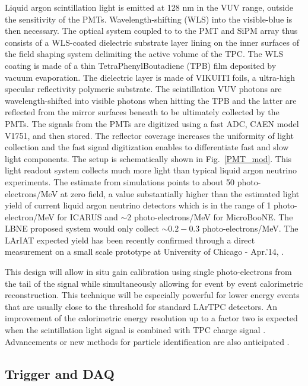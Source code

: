 \documentclass[DIV=calc, paper=a4, fontsize=10pt, twocolumn]{scrartcl}	 %
\begin{document}
{Liquid argon scintillation light is emitted at 128 nm in the VUV range, outside the sensitivity of the PMTs. Wavelength-shifting (WLS) into the visible-blue is then necessary. The optical system coupled to to the PMT and SiPM array thus consists of a WLS-coated dielectric substrate layer lining on the inner surfaces of the field shaping system delimiting the active volume of the TPC. The WLS coating is made of a thin TetraPhenylBoutadiene (TPB) film deposited by vacuum evaporation. The dielectric layer is made of VIKUITI foils, a ultra-high specular reflectivity polymeric substrate. The scintillation VUV photons are wavelength-shifted into visible photons when hitting the TPB and the latter are reflected from the mirror surfaces beneath to be ultimately collected by the PMTs. The signals from the PMTs are digitized using a fast ADC, CAEN model V1751, and then stored.  The reflector coverage increases the uniformity of light collection and the fast  signal digitization enables to differentiate fast and slow light components. The setup is schematically shown in Fig.~\ref{PMT_mod}. This light readout system collects much more light than typical liquid argon neutrino experiments. The estimate from simulations points to about 50 photo-electrons/MeV at zero field, a value substantially higher than the estimated light yield of current liquid argon neutrino detectors  which is in the range of 1 photo-electron/MeV for ICARUS and  $\sim$2 photo-electrons/MeV for MicroBooNE.  The LBNE proposed system would only collect $\sim 0.2-0.3$ photo-electrons/MeV. The LArIAT expected yield has been recently confirmed through a direct measurement on a small scale prototype at University of Chicago - Apr.'14, \cite{UoC}.  

This design will allow in situ gain calibration using single photo-electrons from the tail of the signal while simultaneously allowing for event by event calorimetric reconstruction. This technique will be especially powerful for lower energy events that are usually close to the threshold for standard LArTPC detectors. An improvement of the calorimetric energy resolution up to a factor two is expected when the scintillation light signal is combined with TPC charge signal \cite{szydagis}. Advancements or new methods for particle identification are also anticipated \cite{Sorel}.

\subsection{Trigger and DAQ}

}
\end{document}
